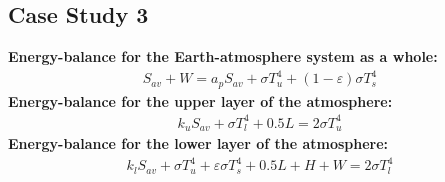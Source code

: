 \documentclass[11pt]{article}
\begin{document}
\subsection*{Case Study 3}
\textbf{Energy-balance for the Earth-atmosphere system as a whole:}
\begin{align}\label{eq:3a}
	S_{av} + W = a_{p}S_{av} + \sigma T_{u}^{4} + (1 - \varepsilon)\sigma T_{s}^{4}
\end{align}
\textbf{Energy-balance for the upper layer of the atmosphere:}
\begin{align}\label{eq:3b}
	k_{u}S_{av} + \sigma T_{l}^{4} + 0.5L = 2\sigma T_{u}^{4}
\end{align}
\textbf{Energy-balance for the lower layer of the atmosphere:}
\begin{align}\label{eq:3c}
	k_{l}S_{av} + \sigma T_{u}^{4} + \varepsilon \sigma T_{s}^{4} + 0.5L + H + W = 2\sigma T_{l}^{4}
\end{align}
\end{document}
